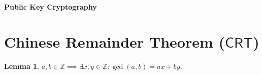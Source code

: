 \documentclass{article}
\newtheorem*{lemma*}{Lemma}
\theoremstyle{definition}
\newcommand{\Z}{\mathbb{Z}}
\newcommand{\of}[1]{\left( #1 \right)}
\begin{document}
\begin{center}
	\huge\textbf{Public Key Cryptography}\\
	\vspace{0.5em}
\end{center}

\section{Chinese Remainder Theorem ($\mathsf{CRT}$)}

\begin{tcolorbox}[colback=white,colframe=lemcolor,arc=5pt,title={\hypertarget{lem}{}\color{white}\bf Bézout's Identity}]
	\begin{lemma*}
		$a,b\in\Z\implies\exists x,y\in\Z:\gcd\of{a,b}=ax+by$.
	\end{lemma*}
\end{tcolorbox}
\end{document}
